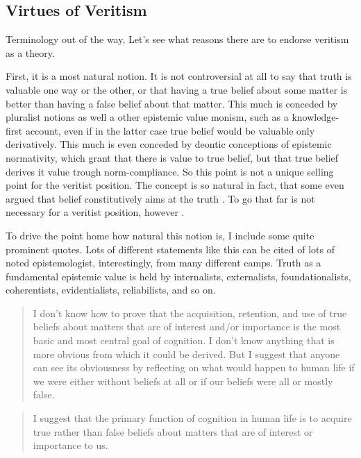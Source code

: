 \documentclass[12pt,numbers=noenddot]{scrartcl}
\begin{document}
\subsection { Virtues of Veritism }
Terminology out of the way, Let's see what reasons there are to endorse veritism as a theory.

First, it is a most natural notion. It is not controversial at all to say that truth is valuable one way or the other, or that having a true belief about some matter is better than having a false belief about that matter. This much is conceded by pluralist notions as well a other epistemic value monism, such as a knowledge-first account, even if in the latter case true belief would be valuable only derivatively. This much is even conceded by deontic conceptions of epistemic normativity, which grant that there is value to true belief, but that true belief derives it value trough norm-compliance. So this point is not a unique selling point for the veritist position. The concept is so natural in fact, that some even argued that belief constitutively aims at the truth \autocite{Shah2003-SHAHTG,Velleman2000-VELOTA}. To go that far is not necessary for a veritist position, however \autocite[361]{Berker2013-BERETA-2}.

To drive the point home how natural this notion is, I include some quite prominent quotes. Lots of different statements like this can be cited of lots of noted epistemologist, interestingly, from many different camps. Truth as a fundamental epistemic value is held by internalists, externalists, foundationalists, coherentists, evidentialists, reliabilists, and so on.

\begin{quote}
I don't know how to prove that the acquisition, retention, and use of true beliefs about matters that are of interest and/or importance is the most basic and most central goal of cognition. I don't know anything that is more obvious from which it could be derived. But I suggest that anyone can see its obviousness by reflecting on what would happen to human life if we were either without beliefs at all or if our beliefs were all or mostly false. \autocite[30]{Alston2005-ALSBJD}
\end{quote}

\begin{quote}
 I suggest that the primary function of cognition in human life is to acquire true rather than false beliefs about matters that are of interest or importance to us. \autocite[29]{Alston2005-ALSBJD}
\end{quote}
\end{document}
